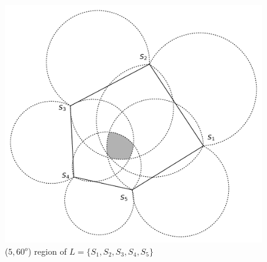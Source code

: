 \begin{figure}[!h]
\centering
\includegraphics[scale=0.6]{Hinhanh/multipleview-region}
\caption{($5,60^o$) region of $L=\{S_1,S_2,S_3,S_4,S_5\}$}
\label{multipleview}
\end{figure}

